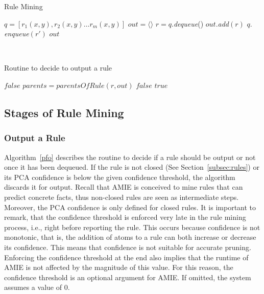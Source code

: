 \begin{algorithm}
\caption{Rule Mining}
\label{rm}
\begin{algorithmic}[1]
    \State $q = [r_1(x,y), r_2(x,y) \dots r_m(x,y)] $
    \State $out = \langle \rangle$
	  \State $r = q.$\emph{dequeue}()
	      \State $out.$\emph{add}$(r)$
	    \EndIf
	  \EndIf
			\State $q.$\emph{enqueue}$(r')$
		      \EndIf
		    \EndIf
		  \EndFor
	    \EndFor
	  \EndIf  
	\EndWhile
    \State \Return $out$
\EndFunction
\end{algorithmic}
\end{algorithm}
\ \\[-1cm]
\begin{algorithm}
\caption{Routine to decide to output a rule}
\label{pfo}
\begin{algorithmic}[1]
      \State \Return $false$
    \EndIf 
    \State $parents = parentsOfRule(r, out)$
	\State \Return $false$
      \EndIf
    \EndFor
    \State \Return $true$
\EndFunction
\end{algorithmic}
\end{algorithm}

\subsection{Stages of Rule Mining}
\subsubsection{Output a Rule}  
\label{subsubsec:whenToOutput}
Algorithm~\ref{pfo} describes the routine to decide if a rule should be output or 
not once it has been dequeued. If the rule is not closed (See Section~\ref{subsec:rules}) or 
its PCA confidence is below the given confidence threshold, the algorithm discards it for output. 
Recall that AMIE is conceived to mine rules that can predict concrete facts, thus non-closed rules are
seen as intermediate steps. Moreover, the PCA confidence is only defined for closed rules.
It is important to remark, that the confidence threshold is enforced 
very late in the rule mining process, i.e., right before reporting the rule. 
This occurs because confidence is not monotonic, that is, the addition of atoms to a rule
can both increase or decrease its confidence. This means that confidence is not suitable for accurate
pruning. Enforcing the confidence threshold at the end also implies that
the runtime of AMIE is not affected by the magnitude of this value. For this reason, 
the confidence threshold is an optional argument for AMIE. If omitted, the system assumes a value of 0. 

